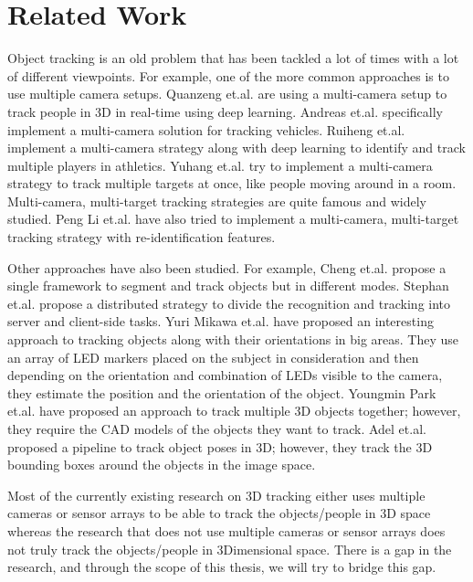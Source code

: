 \documentclass[12pt]{report}
\begin{document}
\chapter{Related Work}

Object tracking is an old problem that has been tackled a lot of times with a lot of different viewpoints. For example, one of the more common approaches is to use multiple camera setups. Quanzeng et.al.\cite{1} are using a multi-camera setup to track people in 3D in real-time using deep learning. Andreas et.al.\cite{2} specifically implement a multi-camera solution for tracking vehicles. Ruiheng et.al.\cite{3}  implement a multi-camera strategy along with deep learning to identify and track multiple players in athletics. Yuhang et.al.\cite{4} try to implement a multi-camera strategy to track multiple targets at once, like people moving around in a room. Multi-camera, multi-target tracking strategies are quite famous and widely studied. Peng Li et.al.\cite{5} have also tried to implement a multi-camera, multi-target tracking strategy with re-identification features.\newline

Other approaches have also been studied. For example, Cheng et.al.\cite{6} propose a single framework to segment and track objects but in different modes. Stephan et.al.\cite{7} propose a distributed strategy to divide the recognition and tracking into server and client-side tasks. Yuri Mikawa et.al.\cite{8} have proposed an interesting approach to tracking objects along with their orientations in big areas. They use an array of LED markers placed on the subject in consideration and then depending on the orientation and combination of LEDs visible to the camera, they estimate the position and the orientation of the object. Youngmin Park et.al.\cite{9} have proposed an approach to track multiple 3D objects together; however, they require the CAD models of the objects they want to track. Adel et.al.\cite{10} proposed a pipeline to track object poses in 3D; however, they track the 3D  bounding boxes around the objects in the image space.\newline

Most of the currently existing research on 3D tracking either uses multiple cameras or sensor arrays to be able to track the objects/people in 3D space whereas the research that does not use multiple cameras or sensor arrays does not truly track the objects/people in 3Dimensional space. There is a gap in the research, and through the scope of this thesis, we will try to bridge this gap. 
\end{document}
